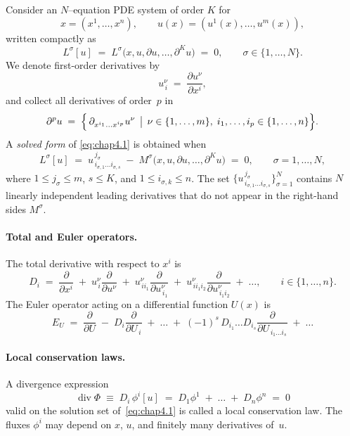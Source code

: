 \documentclass[alpha-refs, 12pt]{wiley-article}
\renewcommand{\leq}{\leqslant}
\newcommand{\pd}[2]{\frac{\partial #1}{\partial #2}}
\begin{document}
Consider an $N$–equation PDE system of order $K$ for
\[
  x=(x^{1},\dots,x^{n}),\qquad
  u(x)=(u^{1}(x),\dots,u^{m}(x)),
\]
written compactly as
\begin{equation}\label{eq:chap4.1}
  L^{\sigma}[u]\;=\;L^{\sigma}\bigl(x,u,\partial u,\dots,\partial^{K}u\bigr)\;=\;0,
  \qquad \sigma \in \{1,\dots,N\}.
\end{equation}
We denote first-order derivatives by
\[
  u^{\nu}_{\,i}\;=\;\pd{u^{\nu}}{x^{i}}, 
\]
and collect all derivatives of order~$p$ in
\begin{equation}\label{eq:chap4.7}
  \partial^{p}u\;=\;
  \Bigl\{\,
      \partial_{x^{i_{1}}\dots x^{i_{p}}} u^{\nu} \,\bigm|\,
      \nu \in \{1,\dots,m\},\;
      i_{1},\dots,i_{p} \in \{1,\dots,n\}
  \Bigr\}.
\end{equation}
A \emph{solved form} of \eqref{eq:chap4.1} is obtained when
\begin{equation}\label{eq:chap4.5}
  L^{\sigma}[u]\;=\;
  u^{\,j_{\sigma}}_{\,i_{\sigma,1}\dots i_{\sigma,s}}
  \;-\;
  M^{\sigma}\bigl(x,u,\partial u,\dots,\partial^{K}u\bigr)
  \;=\;0,
  \qquad
  \sigma=1,\dots,N,
\end{equation}
where $1\leq j_{\sigma}\leq m$, $s\leq K$, and $1\leq i_{\sigma,k}\leq n$. The set $\{u^{\,j_{\sigma}}_{\,i_{\sigma,1}\dots i_{\sigma,s}}\}_{\sigma=1}^{N}$ contains $N$ linearly independent leading derivatives that do not appear in the right-hand sides $M^{\sigma}$.

\paragraph{Total and Euler operators.} The total derivative with respect to $x^{i}$ is
\[
  D_{i}\;=\;
  \pd{}{x^{i}}
  \;+\;
  u^{\nu}_{\,i}\pd{}{u^{\nu}}
  \;+\;
  u^{\nu}_{\,ii_{1}}\pd{}{u^{\nu}_{\,i_{1}}}
  \;+\;
  u^{\nu}_{\,ii_{1}i_{2}}\pd{}{u^{\nu}_{\,i_{1}i_{2}}}
  \;+\;\dots,
  \qquad i \in \{1,\dots,n\}.
\]
The Euler operator acting on a differential function $U(x)$ is
\begin{equation}\label{eq:chap4.4}
  E_{U}\;=\;
  \pd{}{U}
  \;-\;
  D_{i}\pd{}{U_{\,i}}
  \;+\;
  \dots
  \;+\;
  (-1)^{s}\,D_{i_{1}}\dots D_{i_{s}}
  \pd{}{U_{\,i_{1}\dots i_{s}}}
  \;+\;\dots
\end{equation}

\paragraph{Local conservation laws.} A divergence expression
\begin{equation}\label{eq:chap4.2}
  \operatorname{div}\Phi
  \;\equiv\;
  D_{i}\,\phi^{i}[u]
  \;=\;
  D_{1}\phi^{1}
  \;+\;\dots\;+\;
  D_{n}\phi^{n}
  \;=\;0
\end{equation}
valid on the solution set of~\eqref{eq:chap4.1} is called a local conservation law. The fluxes $\phi^{i}$ may depend on $x$, $u$, and finitely many derivatives of~$u$.
\end{document}
